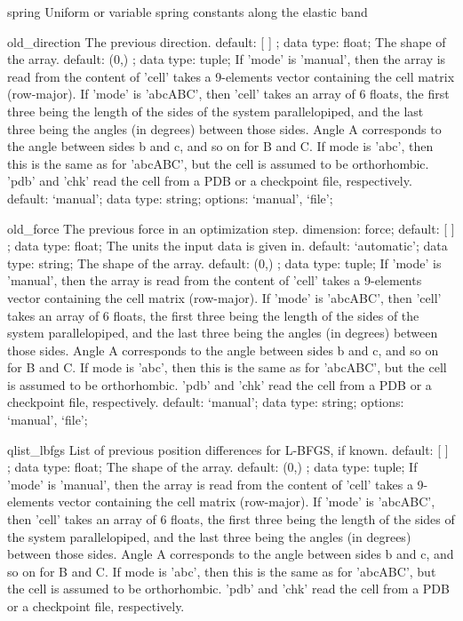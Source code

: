 \begin{ipifield}{}
\begin{ipifield}{spring}
{Uniform or variable spring constants along the elastic band}%
{}%
{}
\end{ipifield}
\begin{ipifield}{old\_direction}%
{The previous direction.}%
{default:  [ ] ; data type: float; }%
{%
{The shape of the array.}%
{default:  (0,) ; data type: tuple; }%
%
{If 'mode' is 'manual', then the array is read from the content of 'cell' takes a 9-elements vector containing the cell matrix (row-major). If 'mode' is 'abcABC', then 'cell' takes an array of 6 floats, the first three being the length of the sides of the system parallelopiped, and the last three being the angles (in degrees) between those sides. Angle A corresponds to the angle between sides b and c, and so on for B and C. If mode is 'abc', then this is the same as for 'abcABC', but the cell is assumed to be orthorhombic. 'pdb' and 'chk' read the cell from a PDB or a checkpoint file, respectively.}%
{default: `manual'; data type: string; options: `manual', `file'; }%
}
\end{ipifield}
\begin{ipifield}{old\_force}%
{The previous force in an optimization step.}%
{dimension: force; default:  [ ] ; data type: float; }%
{%
{The units the input data is given in.}%
{default: `automatic'; data type: string; }%
%
{The shape of the array.}%
{default:  (0,) ; data type: tuple; }%
%
{If 'mode' is 'manual', then the array is read from the content of 'cell' takes a 9-elements vector containing the cell matrix (row-major). If 'mode' is 'abcABC', then 'cell' takes an array of 6 floats, the first three being the length of the sides of the system parallelopiped, and the last three being the angles (in degrees) between those sides. Angle A corresponds to the angle between sides b and c, and so on for B and C. If mode is 'abc', then this is the same as for 'abcABC', but the cell is assumed to be orthorhombic. 'pdb' and 'chk' read the cell from a PDB or a checkpoint file, respectively.}%
{default: `manual'; data type: string; options: `manual', `file'; }%
}
\end{ipifield}
\begin{ipifield}{qlist\_lbfgs}%
{List of previous position differences for L-BFGS, if known.}%
{default:  [ ] ; data type: float; }%
{%
{The shape of the array.}%
{default:  (0,) ; data type: tuple; }%
%
{If 'mode' is 'manual', then the array is read from the content of 'cell' takes a 9-elements vector containing the cell matrix (row-major). If 'mode' is 'abcABC', then 'cell' takes an array of 6 floats, the first three being the length of the sides of the system parallelopiped, and the last three being the angles (in degrees) between those sides. Angle A corresponds to the angle between sides b and c, and so on for B and C. If mode is 'abc', then this is the same as for 'abcABC', but the cell is assumed to be orthorhombic. 'pdb' and 'chk' read the cell from a PDB or a checkpoint file, respectively.}%
}
\end{ipifield}
\end{ipifield}
